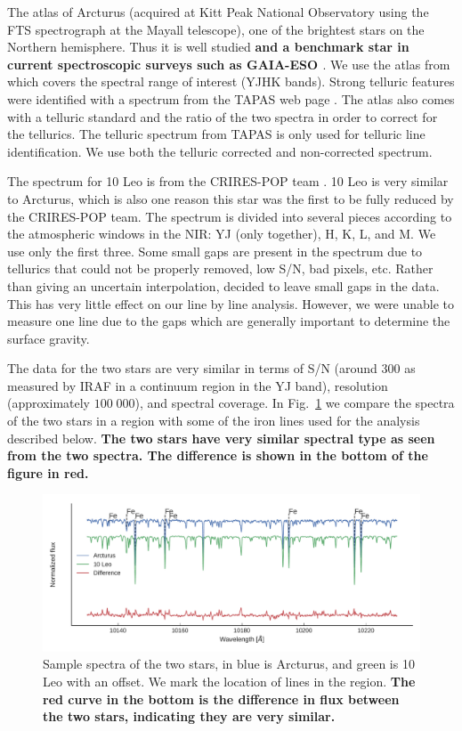 \documentclass{aa}
\begin{document}
The atlas of Arcturus (acquired at Kitt Peak National Observatory using the FTS
spectrograph at the Mayall telescope), one of the brightest stars on the
Northern hemisphere. Thus it is well studied \citep[see e.g.][to mention just a
few]{Griffin1967,McWilliam1990,Ramirez2013} {\bf and a benchmark star in current
spectroscopic surveys such as GAIA-ESO \citep{Jofre2014,Smiljanic2014}}. We use
the atlas from \citet{Hinkle1995a} which covers the spectral range of interest
(YJHK bands). Strong telluric features were identified with a spectrum from the
TAPAS web page \citep{Bertaux2014}. The atlas also comes with a telluric
standard and the ratio of the two spectra in order to correct for the tellurics.
The telluric spectrum from TAPAS is only used for telluric line identification.
We use both the telluric corrected and non-corrected spectrum.

The spectrum for 10 Leo is from the CRIRES-POP team \citep{Nicholls2017}. 10 Leo
is very similar to Arcturus, which is also one reason this star was the first to
be fully reduced by the CRIRES-POP team. The spectrum is divided into several
pieces according to the atmospheric windows in the NIR: YJ (only together), H,
K, L, and M. We use only the first three. Some small gaps are present in the
spectrum due to tellurics that could not be properly removed, low S/N, bad
pixels, etc. Rather than giving an uncertain interpolation, \citet{Nicholls2017}
decided to leave small gaps in the data. This has very little effect on our line
by line analysis. However, we were unable to measure one  line due
to the gaps which are generally important to determine the surface gravity.

The data for the two stars are very similar in terms of S/N (around 300 as
measured by IRAF in a continuum region in the YJ band), resolution
(approximately $100\;000$), and spectral coverage. In Fig.~\ref{fig:both} we
compare the spectra of the two stars in a region with some of the iron lines
used for the analysis described below. {\bf The two stars have very similar
spectral type as seen from the two spectra. The difference is shown in the
bottom of the figure in red.}

\begin{figure}[htpb!]
    \centering
    \includegraphics[width=1.0\linewidth]{figures/bothspectra.pdf}
    \caption{Sample spectra of the two stars, in blue is Arcturus, and green is
             10 Leo with an offset. We mark the location of  lines in
             the region. {\bf The red curve in the bottom is the difference in
             flux between the two stars, indicating they are very similar.}}
    \label{fig:both}
\end{figure}
\end{document}
